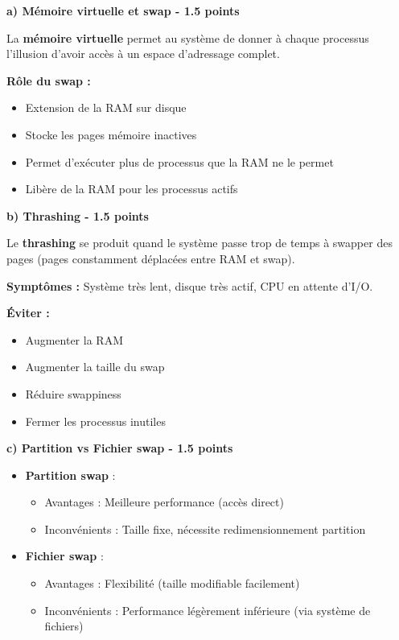 \documentclass[12pt,a4paper]{article}
\begin{document}
\begin{answerbox}
\textbf{a) Mémoire virtuelle et swap - 1.5 points}

La \textbf{mémoire virtuelle} permet au système de donner à chaque processus l'illusion d'avoir accès à un espace d'adressage complet.

\textbf{Rôle du swap :}
\begin{itemize}
    \item Extension de la RAM sur disque
    \item Stocke les pages mémoire inactives
    \item Permet d'exécuter plus de processus que la RAM ne le permet
    \item Libère de la RAM pour les processus actifs
\end{itemize}

\textbf{b) Thrashing - 1.5 points}

Le \textbf{thrashing} se produit quand le système passe trop de temps à swapper des pages (pages constamment déplacées entre RAM et swap).

\textbf{Symptômes :} Système très lent, disque très actif, CPU en attente d'I/O.

\textbf{Éviter :}
\begin{itemize}
    \item Augmenter la RAM
    \item Augmenter la taille du swap
    \item Réduire swappiness
    \item Fermer les processus inutiles
\end{itemize}

\textbf{c) Partition vs Fichier swap - 1.5 points}

\begin{itemize}
    \item \textbf{Partition swap} :
    \begin{itemize}
        \item Avantages : Meilleure performance (accès direct)
        \item Inconvénients : Taille fixe, nécessite redimensionnement partition
    \end{itemize}
    \item \textbf{Fichier swap} :
    \begin{itemize}
        \item Avantages : Flexibilité (taille modifiable facilement)
        \item Inconvénients : Performance légèrement inférieure (via système de fichiers)
    \end{itemize}
\end{itemize}


\end{answerbox}
\end{document}
